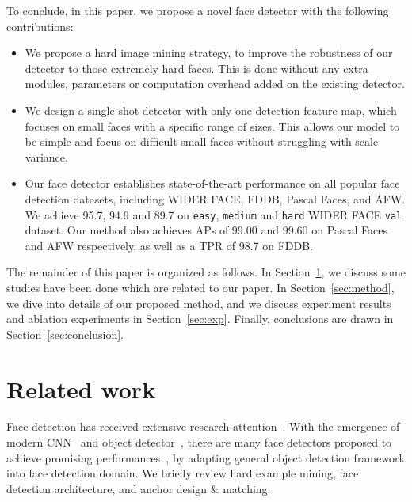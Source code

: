 \documentclass[10pt,twocolumn,letterpaper]{article}
\begin{document}
To conclude, in this paper, we propose a novel face detector with the following
contributions:
\begin{itemize}
    \item We propose a hard image mining strategy, to improve the
    robustness of our detector to those extremely hard faces. This is done without
    any extra modules, parameters or computation overhead added on the existing detector.

    \item We design a single shot detector with only one detection feature map, which focuses on small faces with a
    specific range of sizes. This allows our model to be simple and focus on difficult
    small faces without struggling with scale variance.

    \item Our face detector establishes state-of-the-art performance on all popular face
    detection datasets, including WIDER FACE,
    FDDB, Pascal Faces, and AFW. We achieve 95.7, 94.9 and 89.7 on \texttt{easy}, \texttt{medium}
    and \texttt{hard} WIDER FACE \texttt{val} dataset. Our method also achieves APs of 99.00 and
    99.60 on Pascal Faces and AFW respectively, as well as a TPR of 98.7 on FDDB.
\end{itemize}

The remainder of this paper is organized as follows. In Section~\ref{sec:related_work}, we
discuss some studies have been done which are related to our paper. In Section~\ref{sec:method},
we dive into details of our proposed method, and we discuss experiment results and ablation
experiments in Section~\ref{sec:exp}. Finally, conclusions are drawn in Section~\ref{sec:conclusion}.


\section{Related work}\label{sec:related_work}
Face detection has received extensive research attention~\cite{li2014efficient,mathias2014face,viola2004robust}. With the
emergence of modern CNN~\cite{he2016deep,krizhevsky2012imagenet,simonyan2014very} and object detector~\cite{dai2016r,liu2016ssd,redmon2016you,ren2015faster,Zhang_2018_CVPR},
there are
many face detectors proposed to achieve promising performances~\cite{najibi2017ssh,tang2017multiple,Tang_2018_ECCV,wang2017face,wang2017detecting,zhang2017s}, by adapting general object detection framework into face detection domain. We briefly review hard example mining, face detection architecture, and anchor design \& matching.
\end{document}
